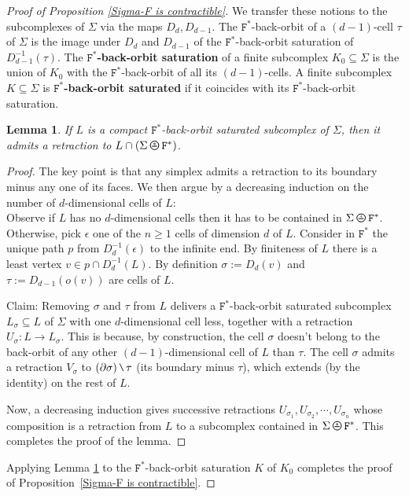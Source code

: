 \documentclass[11pt]{amsart}
\theoremstyle{definition}
\theoremstyle{plain}
\newtheorem{lemma}[definition]{Lemma}
\newcommand{\<}{\langle}
\renewcommand{\>}{\rangle}
\newcommand{\define}[1]{\textbf{#1}}
\newcommand{\Dual}{D}
\newcommand{\oPerpStar}{\begin{tikzpicture}[scale=0.134]
\draw[thick,line width=0.7pt](-0.6,-0.2)--(0.6,-0.2) ;
    \draw (0,0.1) node[scale=0.6] {\rm{*}};
  \draw[line width=0.7pt] (0,0) circle [radius=1];
\end{tikzpicture}}
\newcommand{\oPerpstar}{\mathbin{\raisebox{-1pt}{\oPerpStar}}}
\newcommand{\mysetminusD}{\hbox{\tikz{\draw[line width=0.6pt,line cap=round] (3pt,0) -- (0,6pt);}}}
\newcommand{\mysetminusT}{\mysetminusD}
\newcommand{\mysetminusS}{\hbox{\tikz{\draw[line width=0.45pt,line cap=round] (2pt,0) -- (0,4pt);}}}
\newcommand{\mysetminusSS}{\hbox{\tikz{\draw[line width=0.4pt,line cap=round] (1.5pt,0) -- (0,3pt);}}}
\newcommand{\mysetminus}{\mathbin{\mathchoice{\mysetminusD}{\mysetminusT}{\mysetminusS}{\mysetminusSS}}}%
\begin{document}
\begin{proof}[Proof of Proposition \ref{Sigma-F is contractible}]
We transfer these notions to the subcomplexes of ${\Sigma}$ via the maps $\Dual_{d}, \Dual_{d-1}$.
The ${\mathtt{F}^{*}}$-back-orbit of a $(d-1)$-cell $\tau$ of ${\Sigma}$ is the image under $\Dual_{d}$ and $\Dual_{d-1}$ of the ${\mathtt{F}^{*}}$-back-orbit saturation of $\Dual_{d-1}^{-1}(\tau)$.
The \define{${\mathtt{F}^{*}}$-back-orbit saturation} of a finite subcomplex $K_0\subseteq {\Sigma}$ is the union of $K_0$ with the ${\mathtt{F}^{*}}$-back-orbit of all its $(d-1)$-cells.
A finite subcomplex $K\subseteq {\Sigma}$ is \define{${\mathtt{F}^{*}}$-back-orbit saturated} if it coincides with its ${\mathtt{F}^{*}}$-back-orbit saturation.

\begin{lemma}\label{lem:back-orbit_retraction}
If $L$ is a compact ${\mathtt{F}^{*}}$-back-orbit saturated subcomplex of ${\Sigma} $, then it admits a retraction to $L\cap ({\Sigma}\oPerpstar {{\mathtt{F}^{*}}})$.
\end{lemma}

\begin{proof}
The key point is that any simplex admits a retraction to its boundary minus any one of its faces.
We then argue by a decreasing induction on the number of $d$-dimensional cells of $L$:
\\
Observe if $L$ has no $d$-dimensional cells then it has to be contained in ${\Sigma}\oPerpstar {{\mathtt{F}^{*}}}$.
\\
Otherwise, pick $\epsilon$ one of the $n\geq 1$ cells of dimension $d$ of $L$.
Consider in ${\mathtt{F}^{*}}$ the unique path $p$ from $\Dual_{d}^{-1}(\epsilon)$ to the infinite end.
By finiteness of $L$ there is a least vertex $v\in p\cap \Dual_{d}^{-1}(L)$.
By definition $\sigma:=\Dual_{d}(v)$ and $\tau:=\Dual_{d-1}(o(v))$ are cells of $L$.



Claim:
Removing $\sigma$ and $\tau$ from $L$ delivers a ${\mathtt{F}^{*}}$-back-orbit saturated subcomplex $L_{\sigma}\subseteq L$ of ${\Sigma} $ with one $d$-dimensional cell less, together with a retraction $U_{\sigma}: L\to L_{\sigma}$. 
This is because, by construction, the cell $\sigma$ doesn't belong to the back-orbit of any other $(d-1)$-dimensional cell of $L$ than $\tau$.
The cell $\sigma$ admits a retraction $V_{\sigma}$ to $(\partial \sigma)\mysetminus \tau$ (its boundary minus $\tau$), which extends (by the identity) on the rest of $L$.

Now, a decreasing induction gives successive retractions $U_{\sigma_1}, U_{\sigma_2}, \cdots, U_{\sigma_n}$ whose composition is a retraction from $L$ to a subcomplex contained in ${\Sigma}\oPerpstar {{\mathtt{F}^{*}}}$. This completes the proof of the lemma.\end{proof}

Applying Lemma \ref{lem:back-orbit_retraction} to the ${\mathtt{F}^{*}}$-back-orbit saturation $K$ of $K_0$ completes the proof of Proposition~\ref{Sigma-F is contractible}.
\end{proof}
\end{document}

